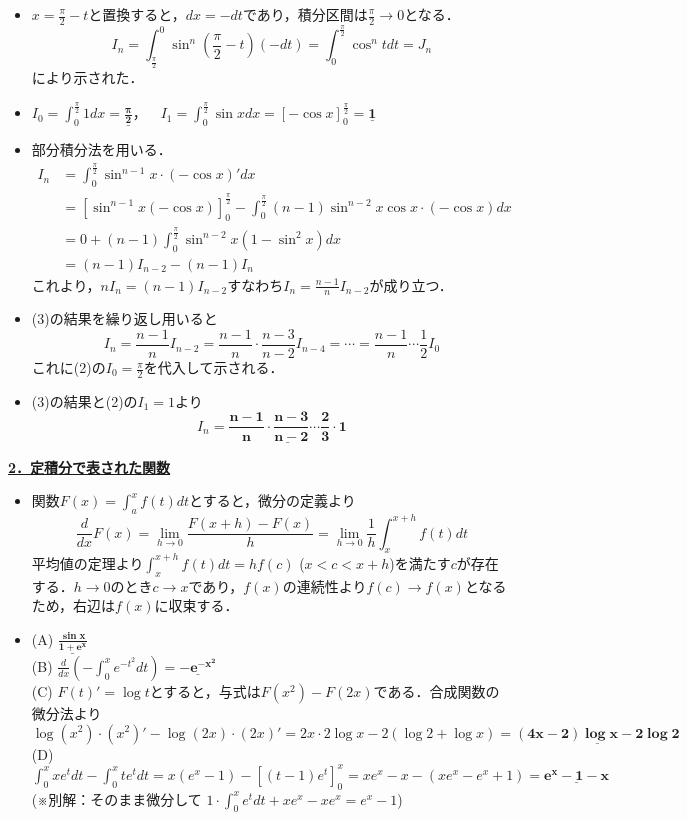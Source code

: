 \documentclass[a4paper,11pt]{ltjsarticle}
\begin{document}
\begin{ans}
\begin{itemize}
    \item [(1)]$x=\frac{\pi}{2}-t$と置換すると，$dx=-dt$であり，積分区間は$\frac{\pi}{2}\to 0$となる．
    \[I_n=\int_{\frac{\pi}{2}}^0 \sin^n\left(\frac{\pi}{2}-t\right)(-dt)=\int_0^{\frac{\pi}{2}}\cos^n tdt=J_n\]
    により示された．
    \item [(2)]$I_0=\int_0^{\frac\pi2}1dx=\underline{\boldsymbol{\frac{\pi}{2}}}$，~~$I_1=\int_0^{\frac\pi2}\sin xdx=[-\cos x]_0^{\frac\pi2}=\underline{\boldsymbol{1}}$
    \item [(3)]部分積分法を用いる．
    \begin{align*}
        I_n&=\int_0^{\frac\pi2}\sin^{n-1}x\cdot(-\cos x)'dx\\
        &=[\sin^{n-1}x(-\cos x)]_0^{\frac\pi2}-\int_0^{\frac\pi2}(n-1)\sin^{n-2}x\cos x\cdot(-\cos x)dx\\
        &=0+(n-1)\int_0^{\frac\pi2}\sin^{n-2}x(1-\sin^2x)dx\\
        &=(n-1)I_{n-2}-(n-1)I_n
    \end{align*}
    これより，$nI_n=(n-1)I_{n-2}$すなわち$I_n=\frac{n-1}{n}I_{n-2}$が成り立つ．
    \item [(4)](3)の結果を繰り返し用いると
    \[I_n=\frac{n-1}{n}I_{n-2}=\frac{n-1}{n}\cdot\frac{n-3}{n-2}I_{n-4}=\cdots=\frac{n-1}{n}\cdots\frac{1}{2}I_0\]
    これに(2)の$I_0=\frac{\pi}{2}$を代入して示される．
    \item [(5)](3)の結果と(2)の$I_1=1$より
    \[I_n=\underline{\boldsymbol{\frac{n-1}{n}\cdot\frac{n-3}{n-2}\cdots\frac{2}{3}\cdot 1}}\]
\end{itemize}
\end{ans}
\noindent \underline{{\large{\textbf{2．定積分で表された関数}}}}
\begin{ans}
\begin{itemize}
    \item [(1)]関数$F(x)=\int_a^x f(t)dt$とすると，微分の定義より
    \[\frac{d}{dx}F(x)=\lim_{h\to 0}\frac{F(x+h)-F(x)}{h}=\lim_{h\to 0}\frac{1}{h}\int_x^{x+h}f(t)dt\]
    平均値の定理より$\int_x^{x+h}f(t)dt=h f(c)$ ($x<c<x+h$)を満たす$c$が存在する．$h\to 0$のとき$c\to x$であり，$f(x)$の連続性より$f(c)\to f(x)$となるため，右辺は$f(x)$に収束する．
    \item [(2)]
    (A) $\underline{\boldsymbol{\frac{\sin x}{1+e^x}}}$ \\
    (B) $\frac{d}{dx}\left(-\int_0^x e^{-t^2}dt\right)=\underline{\boldsymbol{-e^{-x^2}}}$ \\
    (C) $F(t)'=\log t$とすると，与式は$F(x^2)-F(2x)$である．合成関数の微分法より
    \[\log(x^2)\cdot(x^2)'-\log(2x)\cdot(2x)'=2x\cdot 2\log x-2(\log 2+\log x)=\underline{\boldsymbol{(4x-2)\log x-2\log 2}}\]
    (D) $\int_0^x xe^tdt-\int_0^x te^tdt=x(e^x-1)-[(t-1)e^t]_0^x=xe^x-x-(xe^x-e^x+1)=\underline{\boldsymbol{e^x-1-x}}$\\
    (※別解：そのまま微分して $1\cdot\int_0^x e^tdt+x e^x-xe^x = e^x-1$)
\end{itemize}
\end{ans}
\end{document}
